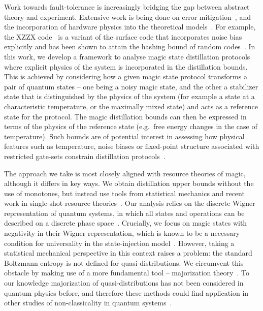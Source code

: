 \documentclass[
onecolumn,
superscriptaddress
]{revtex4-1}
\begin{document}
Work towards fault-tolerance is increasingly bridging the gap between abstract theory and experiment. Extensive work is being done on error mitigation~\cite{jones_2012, Li_2017, Temme_2017, Endo_2018, McClean_2017}, and the incorporation of hardware physics into the theoretical models~\cite{Kandala_2019, holmes_resource_2019, Colless_2018, song2018quantum, Bravyi_2021}. For example, the XZZX code~\cite{bonilla_ataides_xzzx_2021} is a variant of the surface code that incorporates noise bias explicitly and has been shown to attain the hashing bound of random codes~\cite{Bennett_1996}. In this work, we develop a framework to analyse magic state distillation protocols where explicit physics of the system is incorporated in the distillation bounds. This is achieved by considering how a given magic state protocol transforms a pair of quantum states -- one being a noisy magic state, and the other a stabilizer state that is distinguished by the physics of the system (for example a state at a characteristic temperature, or the maximally mixed state) and acts as a reference state for the protocol. The magic distillation bounds can then be expressed in terms of the physics of the reference state (e.g.~free energy changes in the case of temperature). Such bounds are of potential interest in assessing how physical features such as temperature, noise biases or fixed-point structure associated with restricted gate-sets constrain distillation protocols~\cite{Tuckett_2019, Aliferis_2008, Stephens_2013, Li_2015, Babbush_2018, Guillaud_2019, Fowler_2019}.

The approach we take is most closely aligned with resource theories of magic, although it differs in key ways. We obtain distillation upper bounds without the use of monotones, but instead use tools from statistical mechanics and recent work in single-shot resource theories~\cite{cit:janzing, cit:horodecki2013, Brandao_2015, Vinjanampathy_2016, Goold_2016, cit:lostaglio, cit:gour}. Our analysis relies on the discrete Wigner representation of quantum systems, in which all states and operations can be described on a discrete phase space~\cite{Ferrie_2008, Okay_2021}. Crucially, we focus on magic states with negativity in their Wigner representation, which is known to be a necessary condition for universality in the state-injection model~\cite{cit:veitch, cit:mari, cit:gottesman, cit:knill, Campbell_2011}. However, taking a statistical mechanical perspective in this context raises a problem: the standard Boltzmann entropy is not defined for quasi-distributions. We circumvent this obstacle by making use of a more fundamental tool -- majorization theory~\cite{cit:marshall, Veinott_1971, Ruch_1976}. To our knowledge majorization of quasi-distributions has not been considered in quantum physics before, and therefore these methods could find application in other studies of non-classicality in quantum systems~\cite{Fine_1982, Allahverdyan_2018, arvidsson_2020, halpern_2018, Lostaglio_2018, Levy_2020}.\\
\end{document}
